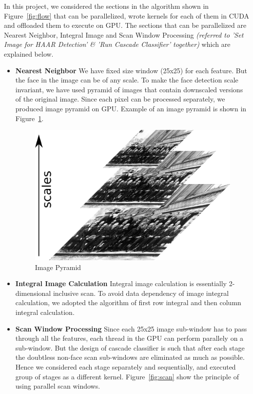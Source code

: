 In this project, we considered the sections in the algorithm shown in
Figure~\ref{fig:flow} that
can be parallelized, wrote kernels for each of them in CUDA
and offloaded them to execute on GPU. The sections that
can be parallelized are Nearest Neighbor, Integral Image and Scan Window Processing
\textit{(referred to 'Set Image for HAAR Detection' \& 'Run Cascade Classifier' together)}
 which are explained below.
\vspace{0.1in}
\begin{itemize}

\item \textbf{Nearest Neighbor}
We have fixed size window (25x25) for each feature. But the face in the image can be of any scale. 
To make the face detection scale  invariant, we have used pyramid of images that contain downscaled versions of the original image. 
Since each pixel can be processed separately, 
we produced image pyramid on GPU. Example of an image pyramid is shown in Figure~\ref{fig:scale}.

\begin{figure}[h]
  \centering
  \includegraphics[width=0.65\linewidth]{figs/scale.jpg}
  \vspace{0.05in}
  \caption{Image Pyramid \textnormal{\small }  }
  \label{fig:scale}
\end{figure}

\vspace{0.1in}
\item \textbf{Integral Image Calculation}
Integral image calculation is essentially 2-dimensional inclusive scan. To avoid data dependency of image integral calculation, we adopted the 
algorithm of first 
row integral and then column integral calculation.

\vspace{0.1in}
\item \textbf{Scan Window Processing}
Since each 25x25 image sub-window has to pass through all the features, each thread in the GPU 
can perform parallely on a sub-window. But the design of cascade classifier is such that after 
each stage the doubtless non-face scan sub-windows are eliminated as much as possible. Hence we 
considered each stage separately and sequentially, and executed group of stages as a different kernel.
Figure~\ref{fig:scan} show the principle of using parallel scan windows. 


\end{itemize}
